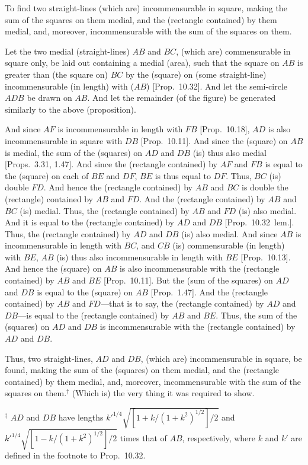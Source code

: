 \begin{Parallel}{}{}
{To find two straight-lines (which are) incommensurable in square, making the sum of the squares on them medial,
and the (rectangle contained) by them medial, and, moreover,
incommensurable  with the sum of the squares on them.

\centerline{}

Let the two medial (straight-lines) $AB$ and $BC$, (which are) commensurable in square only, be laid out containing a medial (area), such
that the square on $AB$ is greater than (the square on) $BC$ by the
(square) on (some straight-line) incommensurable (in length) with ($AB$) [Prop.~10.32].  And let the semi-circle
$ADB$ be drawn on $AB$. And let the remainder (of the figure)
be generated similarly to the above (proposition).

And since $AF$ is incommensurable in length with $FB$ [Prop.~10.18], $AD$
is also incommensurable in square with $DB$ [Prop.~10.11]. And since the (square) on $AB$ is
medial, the sum of the (squares) on $AD$ and $DB$ (is) thus also
medial [Props.~3.31, 1.47]. And since the (rectangle
contained) by $AF$ and $FB$ is equal to the (square) on each of $BE$ and
$DF$, $BE$ is thus equal to $DF$. Thus, $BC$ (is) double $FD$. And
hence the (rectangle contained) by $AB$ and $BC$ is double the
(rectangle) contained by $AB$ and $FD$. And the (rectangle contained)
by $AB$ and $BC$ (is) medial. Thus, the (rectangle contained) by $AB$
and $FD$ (is) also medial. And it is equal to the (rectangle contained) 
by $AD$ and $DB$ [Prop.~10.32~lem.]. Thus, the
(rectangle contained) by $AD$ and $DB$ (is) also medial.
And since $AB$ is incommensurable in length with $BC$, and $CB$
(is) commensurable (in length) with $BE$, $AB$ (is) thus also incommensurable
in length with $BE$ [Prop.~10.13]. And hence the (square) on $AB$ is also incommensurable with the (rectangle contained) by $AB$ and $BE$ [Prop.~10.11]. But the (sum of the squares) on $AD$ and
$DB$ is equal to the (square) on $AB$ [Prop.~1.47].
And the (rectangle contained) by $AB$ and $FD$---that is to say, the (rectangle contained) by $AD$ and $DB$---is equal to the
(rectangle contained) by $AB$ and $BE$. Thus, the sum of the (squares) on
$AD$ and $DB$ is incommensurable with the (rectangle contained) by
$AD$ and $DB$.

Thus, two straight-lines, $AD$ and $DB$, (which are) incommensurable
in square, be found, making the sum of the (squares) on them
medial, and the (rectangle contained) by them medial, and, moreover, 
incommensurable  with the sum of the squares on them.$^\dag$
 (Which is) the
very thing it was required to show.}
\end{Parallel}
{\footnotesize\noindent$^\dag$ $AD$ and $DB$ have lengths
$k'^{1/4}\sqrt{[1+k/(1+k^2)^{1/2}]/2}$ and  $k'^{1/4}\sqrt{[1-k/(1+k^2)^{1/2}]/2}$ times that of $AB$, respectively, where $k$ and $k'$
are defined in the footnote to Prop.~10.32.}

